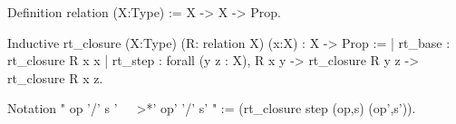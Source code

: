 Definition relation (X:Type) := X -> X -> Prop.

Inductive rt_closure (X:Type) (R: relation X) (x:X) : X -> Prop :=
  | rt_base : rt_closure R x x
  | rt_step : forall (y z : X),
               R x y ->
               rt_closure R y z ->
               rt_closure R x z.

Notation " op '/' s '~~~>*' op' '/' s' " := 
                      (rt_closure step (op,s) (op',s')).